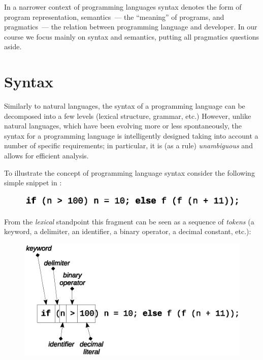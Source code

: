 In a narrower context of programming languages syntax denotes the form of program representation, semantics~--- the ``meaning'' of programs, and pragmatics~---
the relation between programming language and developer. In our course we focus mainly on syntax and semantics, putting all pragmatics questions aside.

\section{Syntax}

Similarly to natural languages, the syntax of a programming language can be decomposed into a few levels (lexical structure, grammar, etc.) However,
unlike natural languages, which have been evolving more or less spontaneously, the syntax for a programming language is intelligently designed taking
into account a number of specific requirements; in particular, it is (as a rule) \emph{unambiguous} and allows for efficient analysis.

To illustrate the concept of programming language syntax consider the following simple snippet in :

\begin{figure}[h]
  \centering
  \includegraphics[scale=0.7]{images/01-01.eps}
\end{figure}

From the \emph{lexical} standpoint this fragment can be seen as a sequence of \emph{tokens} (a keyword, a delimiter, an identifier, a binary operator,
a decimal constant, etc.):

\begin{figure}[h]
  \centering
  \includegraphics[scale=0.7]{images/01-02.eps}
\end{figure}

